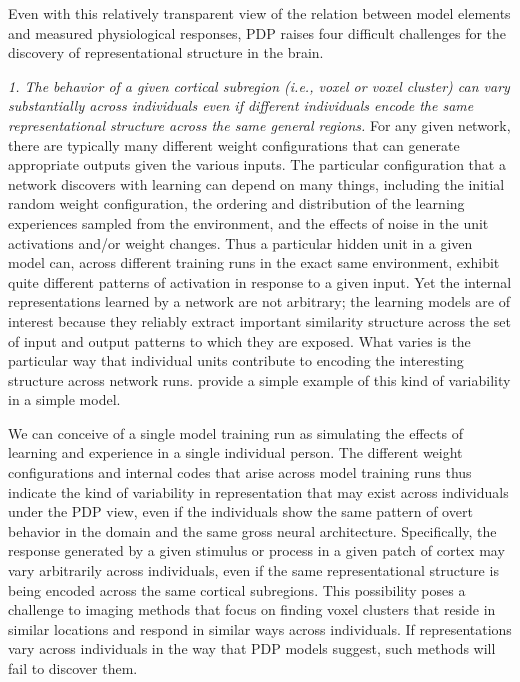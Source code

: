 Even with this relatively transparent view of the relation between model elements and measured physiological responses, PDP raises four difficult challenges for the discovery of representational structure in the brain.

{\em 1. The behavior of a given cortical subregion (i.e., voxel or voxel cluster) can vary substantially across individuals even if different individuals encode the same representational structure across the same general regions.} For any given network, there are typically many different weight configurations that can generate appropriate outputs given the various inputs. The particular configuration that a network discovers with learning can depend on many things, including the initial random weight configuration, the ordering and distribution of the learning experiences sampled from the environment, and the effects of noise in the unit activations and/or weight changes. Thus a particular hidden unit in a given model can, across different training runs in the exact same environment, exhibit quite different patterns of activation in response to a given input. Yet the internal representations learned by a network are not arbitrary; the learning models are of interest because they reliably extract important similarity structure across the set of input and output patterns to which they are exposed. What varies is the particular way that individual units contribute to encoding the interesting structure across network runs.  provide a simple example of this kind of variability in a simple model.

We can conceive of a single model training run as simulating the effects of learning and experience in a single individual person. The different weight configurations and internal codes that arise across model training runs thus indicate the kind of variability in representation that may exist across individuals under the PDP view, even if the individuals show the same pattern of overt behavior in the domain and the same gross neural architecture. Specifically, the response generated by a given stimulus or process in a given patch of cortex may vary arbitrarily across individuals,  even if the same representational structure is being encoded across the same cortical subregions. This possibility poses a challenge to imaging methods that focus on finding voxel clusters that reside in similar locations and respond in similar ways across individuals. If representations vary across individuals in the way that PDP models suggest, such methods will fail to discover them.

